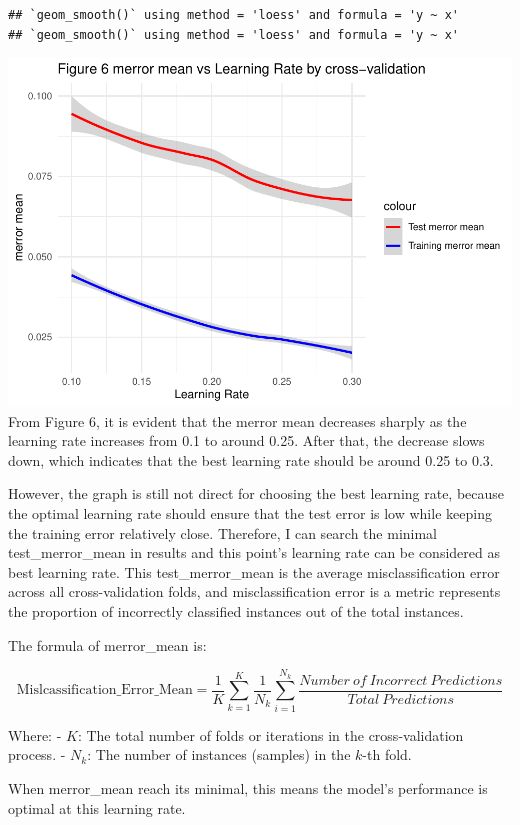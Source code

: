 \documentclass[
]{article}
\begin{document}
\begin{verbatim}
## `geom_smooth()` using method = 'loess' and formula = 'y ~ x'
## `geom_smooth()` using method = 'loess' and formula = 'y ~ x'
\end{verbatim}

\includegraphics{Code_C_files/figure-latex/cross-validation to find optimal learning rate-1.pdf}
From Figure 6, it is evident that the merror mean decreases sharply as
the learning rate increases from 0.1 to around 0.25. After that, the
decrease slows down, which indicates that the best learning rate should
be around 0.25 to 0.3.

However, the graph is still not direct for choosing the best learning
rate, because the optimal learning rate should ensure that the test
error is low while keeping the training error relatively close.
Therefore, I can search the minimal test\_merror\_mean in results and
this point's learning rate can be considered as best learning rate. This
test\_merror\_mean is the average misclassification error across all
cross-validation folds, and misclassification error is a metric
represents the proportion of incorrectly classified instances out of the
total instances.

The formula of merror\_mean is:

\[
\text{Mislcassification_Error_Mean}=\frac{1}{K} \sum_{k=1}^{K} \frac{1}{N_k}\sum_{i=1}^{N_k}\frac{Number\ of\ Incorrect\ Predictions}{Total\ Predictions}
\]

Where: - \(K\): The total number of folds or iterations in the
cross-validation process. - \(N_k\): The number of instances (samples)
in the \(k\)-th fold.

When merror\_mean reach its minimal, this means the model's performance
is optimal at this learning rate.
\end{document}
